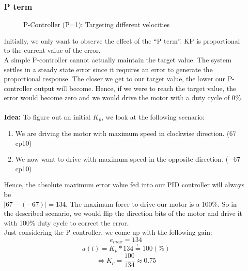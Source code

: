 \subsubsection*{P term}
\begin{figure}
    \centering
{}
    \caption{P-Controller (P=1): Targeting different velocities} \label{fig:P1}
\end{figure}
Initially, we only want to observe the effect of the ``P term''.
KP is proportional to the current value of the error.
\\A simple P-controller cannot actually maintain the target value. The system settles in a steady state error since it requires an error to generate the proportional response.
The closer we get to our target value, the lower our P-controller output will become. Hence, if we were to reach the target value, the error would become zero and we would drive the motor with a duty cycle of 0\%.
\\\\
\textbf{Idea:} To figure out an initial $K_p$, we look at the following scenario:
\begin{enumerate}
    \item We are driving the motor with maximum speed in clockwise direction. ($67$ cp10)
    \item We now want to drive with maximum speed in the opposite direction. ($-67$ cp10)
\end{enumerate}
Hence, the absolute maximum error value fed into our PID controller will always be
\\$| 67 - (-67)| = 134$. The maximum force to drive our motor is a 100\%.
So in the described scenario, we would flip the direction bits of the motor and drive it with 100\% duty cycle to correct the error.\\
Just considering the P-controller, we come up with the following gain:
$$e_{max} = 134$$
$$u(t) = K_p * 134 \stackrel{!}{=} 100 (\%)$$
$$\iff K_p = \frac{100}{134} \approx 0.75$$\\

